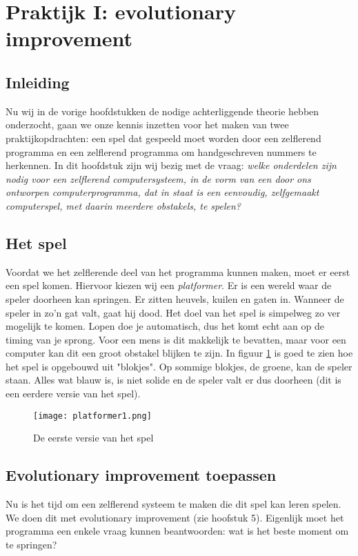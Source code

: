 \section{Praktijk I: evolutionary improvement}

\subsection{Inleiding}
Nu wij in de vorige hoofdstukken de nodige achterliggende theorie hebben onderzocht, gaan we onze kennis inzetten voor het maken van twee praktijkopdrachten: een spel dat gespeeld moet worden door een zelflerend programma en een zelflerend programma om handgeschreven nummers te herkennen. In dit hoofdstuk zijn wij bezig met de vraag: \textit{welke onderdelen zijn nodig voor een zelflerend computersysteem, in de vorm van een door ons ontworpen computerprogramma, dat in staat is een eenvoudig, zelfgemaakt computerspel, met daarin meerdere obstakels, te spelen?}

\subsection{Het spel}
Voordat we het zelflerende deel van het programma kunnen maken, moet er eerst een spel komen. Hiervoor kiezen wij een \textit{platformer}. Er is een wereld waar de speler doorheen kan springen. Er zitten heuvels, kuilen en gaten in. Wanneer de speler in zo'n gat valt, gaat hij dood. Het doel van het spel is simpelweg zo ver mogelijk te komen. Lopen doe je automatisch, dus het komt echt aan op de timing van je sprong. Voor een mens is dit makkelijk te bevatten, maar voor een computer kan dit een groot obstakel blijken te zijn.
In figuur \ref{fig:platformer1} is goed te zien hoe het spel is opgebouwd uit "blokjes". Op sommige blokjes, de groene, kan de speler staan. Alles wat blauw is, is niet solide en de speler valt er dus doorheen (dit is een eerdere versie van het spel).

\begin{figure}[H]
  \centering
    \texttt{[image: platformer1.png]}
  \caption{De eerste versie van het spel}
  \label{fig:platformer1}
\end{figure}

\subsection{Evolutionary improvement toepassen}
Nu is het tijd om een zelflerend systeem te maken die dit spel kan leren spelen. We doen dit met evolutionary improvement (zie hoofstuk 5). Eigenlijk moet het programma een enkele vraag kunnen beantwoorden: wat is het beste moment om te springen?

